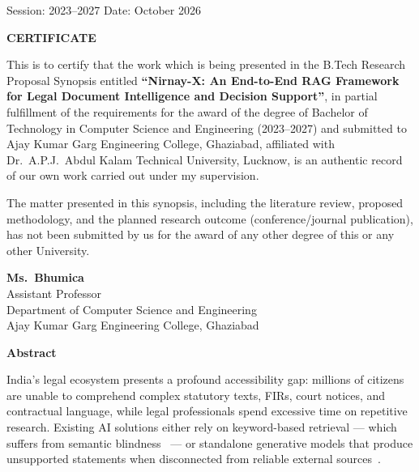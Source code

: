 \documentclass[12pt,a4paper]{article}
\begin{document}
\noindent Session: 2023--2027 \hfill Date: October 2026

\newpage

\begin{center}
  {\large\bfseries CERTIFICATE}
\end{center}

\vspace{0.5cm}

This is to certify that the work which is being presented in the B.Tech Research Proposal
Synopsis entitled \textbf{``Nirnay-X: An End-to-End RAG Framework for Legal Document
Intelligence and Decision Support''}, in partial fulfillment of the requirements for the
award of the degree of Bachelor of Technology in Computer Science and Engineering
(2023--2027) and submitted to Ajay Kumar Garg Engineering College, Ghaziabad, affiliated
with Dr.\ A.P.J.\ Abdul Kalam Technical University, Lucknow, is an authentic record of
our own work carried out under my supervision.

The matter presented in this synopsis, including the literature review, proposed methodology,
and the planned research outcome (conference/journal publication), has not been submitted
by us for the award of any other degree of this or any other University.

\vspace{2.5cm}

\noindent\textbf{Ms.\ Bhumica}\\
Assistant Professor\\
Department of Computer Science and Engineering\\
Ajay Kumar Garg Engineering College, Ghaziabad

\newpage

\begin{center}
  {\large\bfseries Abstract}
\end{center}

\vspace{0.3cm}

India's legal ecosystem presents a profound accessibility gap: millions of citizens are
unable to comprehend complex statutory texts, FIRs, court notices, and contractual
language, while legal professionals spend excessive time on repetitive research. Existing
AI solutions either rely on keyword-based retrieval --- which suffers from semantic
blindness~\cite{manning2008ir} --- or standalone generative models that produce
unsupported statements when disconnected from reliable external sources~\cite{lewis2020rag}.
\end{document}
